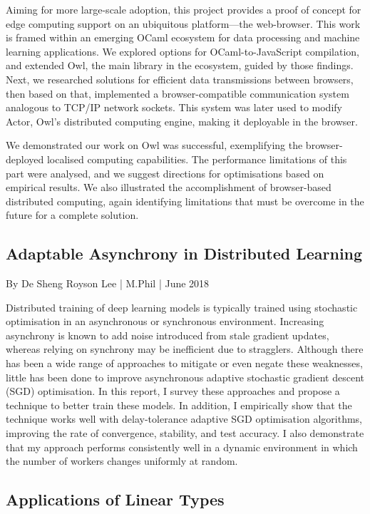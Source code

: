 Aiming for more large-scale adoption, this project provides a proof of concept for edge computing support on an ubiquitous platform—the web-browser. This work is framed within an emerging OCaml ecosystem for data processing and machine learning applications. We explored options for OCaml-to-JavaScript compilation, and extended Owl, the main library in the ecosystem, guided by those findings. Next, we researched solutions for efficient data transmissions between browsers, then based on that, implemented a browser-compatible communication system analogous to TCP/IP network sockets. This system was later used to modify Actor, Owl's distributed computing engine, making it deployable in the browser.

We demonstrated our work on Owl was successful, exemplifying the browser-deployed localised computing capabilities. The performance limitations of this part were analysed, and we suggest directions for optimisations based on empirical results. We also illustrated the accomplishment of browser-based distributed computing, again identifying limitations that must be overcome in the future for a complete solution.


\hypertarget{Adaptable Asynchrony in Distributed Learning}{%
\subsection{Adaptable Asynchrony in Distributed Learning}\label{theses-adapt}}

By De Sheng Royson Lee | M.Phil | June 2018

Distributed training of deep learning models is typically trained using stochastic optimisation in an asynchronous or synchronous environment. Increasing asynchrony is known to add noise introduced from stale gradient updates, whereas relying on synchrony may be inefficient due to stragglers. Although there has been a wide range of approaches to mitigate or even negate these weaknesses, little has been done to improve asynchronous adaptive stochastic gradient descent (SGD) optimisation. In this report, I survey these approaches and propose a technique to better train these models. In addition, I empirically show that the technique works well with delay-tolerance adaptive SGD optimisation algorithms, improving the rate of convergence, stability, and test accuracy. I also demonstrate that my approach performs consistently well in a dynamic environment in which the number of workers changes uniformly at random.


\hypertarget{Applications of Linear Types}{%
\subsection{Applications of Linear Types}\label{theses-linear}}

